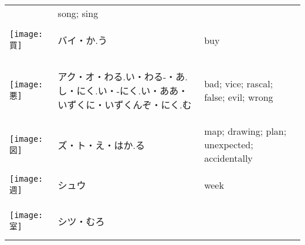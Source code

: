 \documentclass[a4paper,12pt]{extarticle}
\begin{document}
\begin{longtable}{|lp{6cm}p{4cm}|}
&
song; sing
\\ 
\begin{minipage}{0.3\textwidth}
\centerline{
	\texttt{[image: 買]}
}
\end{minipage}
&
\begin{CJK}{UTF8}{min}バイ・か.う\end{CJK}
&
buy
\\ 
\begin{minipage}{0.3\textwidth}
\centerline{
	\texttt{[image: 悪]}
}
\end{minipage}
&
\begin{CJK}{UTF8}{min}アク・オ・わる.い・わる-・あ.し・にく.い・-にく.い・ああ・いずくに・いずくんぞ・にく.む\end{CJK}
&
bad; vice; rascal; false; evil; wrong
\\ 
\begin{minipage}{0.3\textwidth}
\centerline{
	\texttt{[image: 図]}
}
\end{minipage}
&
\begin{CJK}{UTF8}{min}ズ・ト・え・はか.る\end{CJK}
&
map; drawing; plan; unexpected; accidentally
\\ 
\begin{minipage}{0.3\textwidth}
\centerline{
	\texttt{[image: 週]}
}
\end{minipage}
&
\begin{CJK}{UTF8}{min}シュウ\end{CJK}
&
week
\\ 
\begin{minipage}{0.3\textwidth}
\centerline{
	\texttt{[image: 室]}
}
\end{minipage}
&
\begin{CJK}{UTF8}{min}シツ・むろ\end{CJK}

\end{longtable}
\end{document}
